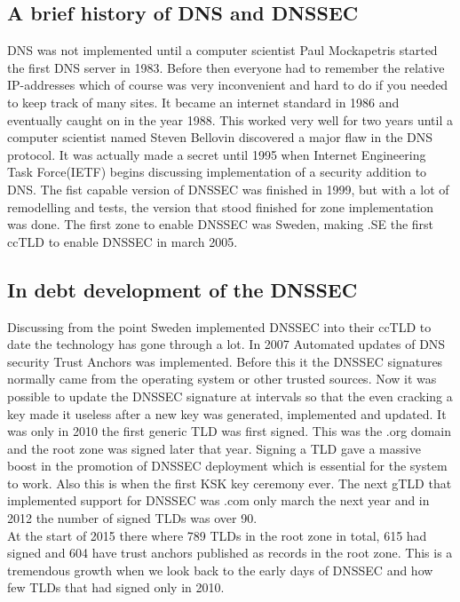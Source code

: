 \documentclass{article}
\begin{document}
		\subsection{A brief history of DNS and DNSSEC}  
		DNS was not implemented until a computer scientist Paul Mockapetris started the first DNS server in 1983. Before then everyone had to remember the relative IP-addresses which of course was very inconvenient and hard to do if you needed to keep track of many sites.
		It became an internet standard in 1986 and eventually caught on in the year 1988.
		This worked very well for two years until a computer scientist named Steven Bellovin discovered a major flaw in the DNS protocol. It was actually made a secret until 1995 when Internet Engineering Task Force(IETF) begins discussing implementation of a security addition to DNS.
		The fist capable version of DNSSEC was finished in 1999, but with a lot of remodelling and tests, the version that stood finished for zone implementation was done.
		The first zone to enable DNSSEC was Sweden, making .SE the first ccTLD to enable DNSSEC in march 2005.\cite{NLnetLabs}
		\subsection{In debt development of the DNSSEC}
		Discussing from the point Sweden implemented DNSSEC into their ccTLD to date the technology has gone through a lot. In 2007 Automated updates of DNS security Trust Anchors was implemented.\cite{trustAnchor} 
		Before this it the DNSSEC signatures normally came from the operating system or other trusted sources. Now it was possible to update the DNSSEC signature at intervals so that the even cracking a key made it useless after a new key was generated, implemented and updated.\cite{icann} It was only in 2010 the first generic TLD was first signed. This was the .org domain and the root zone was signed later that year. Signing a TLD gave a massive boost in the promotion of DNSSEC deployment which is essential for the system to work. Also this is when the first KSK key ceremony ever. The next gTLD that implemented support for DNSSEC was .com only march the next year and in 2012 the number of signed TLDs was over 90.\cite{verisign}\\ At the start of 2015 there where 789 TLDs in the root zone in total, 615 had signed and 604 have trust anchors published as records in the root zone.\cite{icannStats} This is a tremendous growth when we look back to the early days of DNSSEC and how few TLDs that had signed only in 2010.
\end{document}
